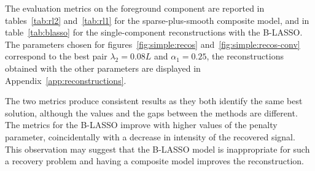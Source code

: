         The evaluation metrics on the foreground component are reported in tables~\ref{tab:rl2} and~\ref{tab:rl1} for the sparse-plus-smooth composite model, and in table~\ref{tab:blasso} for the single-component reconstructions with the B-LASSO. The parameters chosen for figures~\ref{fig:simple:recos} and~\ref{fig:simple:recos-conv} correspond to the best pair $\lambda_2 = 0.08 L$ and $\alpha_1=0.25$, the reconstructions obtained with the other parameters are displayed in Appendix~\ref{app:reconstructions}.

        The two metrics produce consistent results as they both identify the same best solution, although the values and the gaps between the methods are different. The metrics for the B-LASSO improve with higher values of the penalty parameter, coincidentally with a decrease in intensity of the recovered signal. This observation may suggest that the B-LASSO model is inappropriate for such a recovery problem and having a composite model improves the reconstruction. 
        
